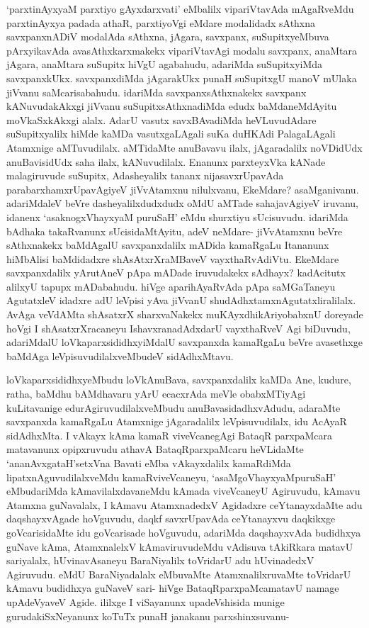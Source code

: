 \begin{artha}
`parxtinAyxyaM parxtiyo gAyxdarxvati' eMbalilx vipariVtavAda mAgaRveMdu parxtinAyxya padada athaR, parxtiyoVgi eMdare modalidadx sAthxna savxpanxnADiV modalAda sAthxna, jAgara, savxpanx, suSupitxyeMbuva pArxyikavAda avasAthxkarxmakekx vipariVtavAgi modalu savxpanx, anaMtara jAgara, anaMtara suSupitx hiVgU agabahudu, adariMda suSupitxyiMda savxpanxkUkx. savxpanxdiMda jAgarakUkx punaH suSupitxgU manoV mUlaka jiVvanu saMcarisabahudu. idariMda savxpanxsAthxnakekx savxpanx kANuvudakAkxgi jiVvanu suSupitxsAthxnadiMda edudx baMdaneMdAyitu moVkaSxkAkxgi alalx. AdarU vasutx savxBAvadiMda heVLuvudAdare suSupitxyalilx hiMde kaMDa vasutxgaLAgali suKa duHKAdi PalagaLAgali Atamxnige aMTuvudilalx. aMTidaMte anuBavavu ilalx, jAgaradalilx noVDidUdx anuBavisidUdx saha ilalx, kANuvudilalx. Enanunx parxteyxVka kANade malagiruvude suSupitx, Adasheyalilx tananx nijasavxrUpavAda parabarxhamxrUpavAgiyeV jiVvAtamxnu nilulxvanu, EkeMdare? asaMganivanu. adariMdaleV beVre dasheyalilxdudxdudx oMdU aMTade sahajavAgiyeV iruvanu, idanenx `asaknogxVhayxyaM puruSaH' eMdu shurxtiyu sUcisuvudu. idariMda bAdhaka takaRvanunx sUcisidaMtAyitu, adeV neMdare- jiVvAtamxnu beVre sAthxnakekx baMdAgalU savxpanxdalilx mADida kamaRgaLu Itananunx hiMbAlisi baMdidadxre shAsAtxrXraMBaveV vayxthaRvAdiVtu. EkeMdare savxpanxdalilx yArutAneV pApa mADade iruvudakekx sAdhayx? kadAcitutx alilxyU tapupx mADabahudu. hiVge aparihAyaRvAda pApa saMGaTaneyu AgutatxleV idadxre adU leVpisi yAva jiVvanU shudAdhxtamxnAgutatxliralilalx. AvAga veVdAMta shAsatxrX sharxvaNakekx muKAyxdhikAriyobabxnU doreyade hoVgi I shAsatxrXracaneyu IshavxranadAdxdarU vayxthaRveV Agi biDuvudu, adariMdalU loVkaparxsididhxyiMdalU savxpanxda kamaRgaLu beVre avasethxge baMdAga leVpisuvudilalxveMbudeV sidAdhxMtavu.
\end{artha}%

\begin{artha}
loVkaparxsididhxyeMbudu loVkAnuBava, savxpanxdalilx kaMDa Ane, kudure, ratha, baMdhu bAMdhavaru yArU ecacxrAda meVle obabxMTiyAgi kuLitavanige edurAgiruvudilalxveMbudu anuBavasidadhx\-\break vAdudu, adaraMte savxpanxda kamaRgaLu Atamxnige jAgaradalilx leVpisuvudilalx, idu AcAyaR sidAdhxMta. I vAkayx kAma kamaR viveVcanegAgi BataqR parxpaMcara matavanunx opipxruvudu athavA BataqRparxpaMcaru heVLidaMte `ananAvxgataH'setxVna Bavati eMba vAkayxdalilx kamaRdiMda lipatxnAguvudilalxveMdu kamaRviveVcaneyu, `asaMgoVhayxyaMpuruSaH' eMbudariMda kAmavilalxdavaneMdu kAmada viveVcaneyU Agiruvudu, kAmavu Atamxna guNavalalx, I kAmavu AtamxnadedxV Agidadxre ceYtanayxdaMte adu daqshayxvAgade hoVguvudu, daqkf savxrUpavAda ceYtanayxvu daqkikxge goVcarisidaMte idu goVcarisade hoVguvudu, adariMda daqshayxvAda budidhxya guNave kAma, AtamxnalelxV kAmaviruvudeMdu vAdisuva tAkiRkara matavU sariyalalx, hUvinavAsaneyu BaraNiyalilx toVridarU adu hUvinadedxV Agiruvudu. eMdU BaraNiyadalalx eMbuvaMte AtamxnalilxruvaMte toVridarU kAmavu budidhxya guNaveV sari- hiVge BataqRparxpaMcamatavU namage upAdeVyaveV Agide. ililxge I viSayanunx upadeVshisida munige gurudakiSxNeyanunx koTuTx punaH janakanu parxshinxsuvanu-
\end{artha}%

